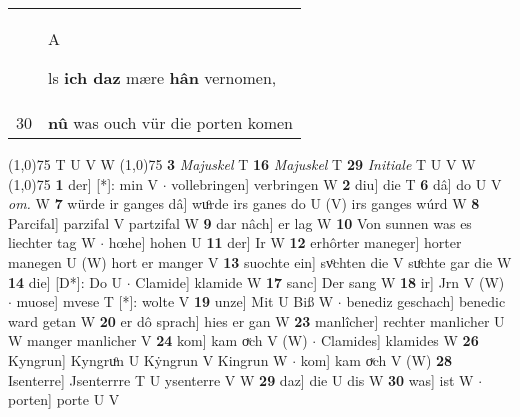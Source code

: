 \documentclass[8pt,a4paper,notitlepage]{article}
\begin{document}
\begin{table}[ht]
\begin{minipage}[t]{0.5\linewidth}
\begin{tabular}{rl}
 & \begin{large}A\end{large}ls \textbf{ich daz} mære \textbf{hân} vernomen,\\ 
30 & \textbf{nû} was ouch vür die porten komen\\ 
\end{tabular}
\scriptsize
\line(1,0){75} \newline
T U V W \newline
\line(1,0){75} \newline
\textbf{3} \textit{Majuskel} T  \textbf{16} \textit{Majuskel} T  \textbf{29} \textit{Initiale} T U V W  \newline
\line(1,0){75} \newline
\textbf{1} der] [*]: min V  $\cdot$ vollebringen] verbringen W \textbf{2} diu] die T \textbf{6} dâ] do U V \textit{om.} W \textbf{7} würde ir ganges dâ] wuͦrde irs ganes do U (V) irs ganges wúrd W \textbf{8} Parcifal] parzifal V partzifal W \textbf{9} dar nâch] er lag W \textbf{10} Von sunnen was es liechter tag W  $\cdot$ hœhe] hohen U \textbf{11} der] Ir W \textbf{12} erhôrter maneger] horter manegen U (W) hort er manger V \textbf{13} suochte ein] svͦchten die V suͦchte gar die W \textbf{14} die] [D*]: Do U  $\cdot$ Clamide] klamide W \textbf{17} sanc] Der sang W \textbf{18} ir] Jrn V (W)  $\cdot$ muose] mvese T [*]: wolte V \textbf{19} unze] Mit U Biß W  $\cdot$ benediz geschach] benedic ward getan W \textbf{20} er dô sprach] hies er gan W \textbf{23} manlîcher] rechter manlicher U W manger manlicher V \textbf{24} kom] kam oͮch V (W)  $\cdot$ Clamides] klamides W \textbf{26} Kyngrun] Kyngruͦn U Kẏngrun V Kingrun W  $\cdot$ kom] kam oͮch V (W) \textbf{28} Isenterre] Jsenterrre T U ysenterre V W \textbf{29} daz] die U dis W \textbf{30} was] ist W  $\cdot$ porten] porte U V \newline
\end{minipage}
\end{table}
\end{document}

